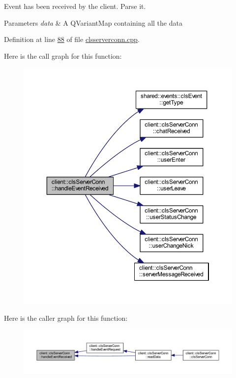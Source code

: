 Event has been received by the client. Parse it. 


\begin{DoxyParams}{Parameters}
{\em data} & A Q\-Variant\-Map containing all the data \\
\hline
\end{DoxyParams}


Definition at line \hyperlink{clsserverconn_8cpp_source_l00088}{88} of file \hyperlink{clsserverconn_8cpp_source}{clsserverconn.\-cpp}.



Here is the call graph for this function\-:\nopagebreak
\begin{figure}[H]
\begin{center}
\leavevmode
\includegraphics[width=350pt]{d3/d65/classclient_1_1cls_server_conn_ad5d3a03440fdec33270247486fb5500c_cgraph}
\end{center}
\end{figure}




Here is the caller graph for this function\-:
\nopagebreak
\begin{figure}[H]
\begin{center}
\leavevmode
\includegraphics[width=350pt]{d3/d65/classclient_1_1cls_server_conn_ad5d3a03440fdec33270247486fb5500c_icgraph}
\end{center}
\end{figure}


